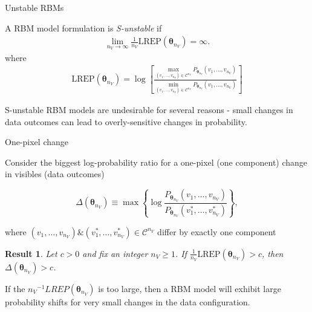 \documentclass[ignorenonframetext,]{beamer}
\newtheorem{result}{Result}
\theoremstyle{definition}
\newcommand{\nv}{{n_{\scriptscriptstyle V}}}
\begin{document}
\begin{frame}{Unstable RBMs}
\protect\hypertarget{unstable-rbms}{}

\begin{definition}
A RBM model formulation is \emph{S-unstable} if
\begin{align*}
\lim\limits_{\nv \rightarrow \infty} \frac{1}{\nv} \text{LREP}(\boldsymbol \theta_{\nv}) = \infty.
\end{align*}
where 
\begin{align}
\label{eqn:elpr}
\text{LREP}(\boldsymbol \theta_{\nv}) = \log \left[\frac{\max\limits_{(v_1, \dots, v_{\nv}) \in \mathcal{C}^\nv}P_{\boldsymbol \theta_\nv}(v_1, \dots, v_\nv)}{\min\limits_{(v_1, \dots, v_\nv) \in \mathcal{C}^\nv}P_{\boldsymbol \theta_\nv}(v_1, \dots, v_\nv)}\right]
\end{align}
\end{definition}

S-unstable RBM models are undesirable for several reasons - small
changes in data outcomes can lead to overly-sensitive changes in
probability.

\end{frame}

\begin{frame}{One-pixel change}
\protect\hypertarget{one-pixel-change}{}

Consider the biggest log-probability ratio for a one-pixel (one
component) change in visibles (data outcomes)

\[
\Delta(\boldsymbol \theta_\nv) \equiv \max \left\{\log \frac{P_{\boldsymbol \theta_\nv}(v_1, \dots, v_\nv)}{P_{\boldsymbol \theta_\nv}(v_1^*, \dots, v_\nv^*)} \right\},
\]

where
\((v_1, \dots, v_\nv) \& (v_1^*, \dots, v_\nv^*) \in \mathcal{C}^\nv\)
differ by exactly one component

\begin{result}
\label{prop:instab}
Let $c > 0$ and fix an integer $\nv \ge 1$. If $\frac{1}{\nv}\text{LREP}(\boldsymbol \theta_\nv) > c$, then $\Delta(\boldsymbol \theta_\nv) > c$.
\end{result}

If the \(\nv^{-1}LREP(\boldsymbol\theta_{\nv})\) is too large, then a
RBM model will exhibit large probability shifts for very small changes
in the data configuration.

\end{frame}
\end{document}
